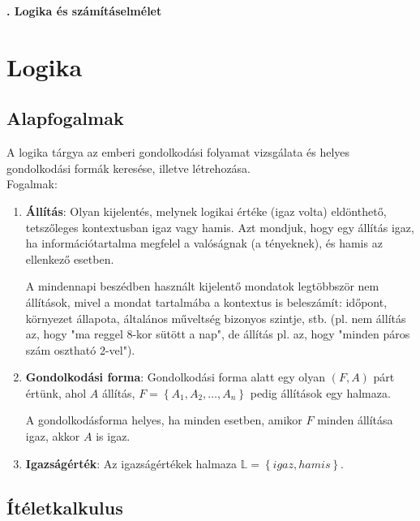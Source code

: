 \documentclass[tikz,12pt,margin=0px]{article}
\begin{document}
    \thispagestyle{fancy}

    \begin{center}
        {\Large\bfseries{}. Logika és számításelmélet} \\
    \end{center}	
	
	\section*{Logika}
	
	\subsection*{Alapfogalmak}
	
	A logika tárgya az emberi gondolkodási folyamat vizsgálata és
	helyes gondolkodási formák keresése, illetve létrehozása.\\
	
	\noindent Fogalmak:
	\begin{enumerate}
		\item	\textbf{Állítás}: Olyan kijelentés, melynek logikai értéke (igaz
		volta) eldönthető, tetszőleges kontextusban igaz vagy hamis. Azt mondjuk,
		hogy egy állítás igaz, ha információtartalma megfelel a valóságnak (a tényeknek),
		és hamis az ellenkező esetben.
		
		A mindennapi beszédben használt kijelentő mondatok legtöbbször nem állítások, mivel
		a mondat tartalmába a kontextus is beleszámít: időpont, környezet állapota, általános műveltség
		bizonyos szintje, stb. (pl. nem állítás az, hogy "ma reggel 8-kor sütött a nap", de állítás pl. az, hogy
		"minden páros szám osztható 2-vel").
		
		\item	\textbf{Gondolkodási forma}: Gondolkodási forma alatt egy olyan $(F,A)$ párt értünk, ahol
		$A$ állítás, $F=\left\{A_{1},A_{2},\ldots,A_{n}\right\}$ pedig állítások egy halmaza.

		A gondolkodásforma helyes, ha minden esetben, amikor $F$ minden állítása igaz, akkor $A$ is igaz.

		\item	\textbf{Igazságérték}: Az igazságértékek halmaza $\mathbb{L}=\left\{igaz,hamis\right\}$.
	\end{enumerate}
	
	\subsection*{Ítéletkalkulus}
	
\end{document}
